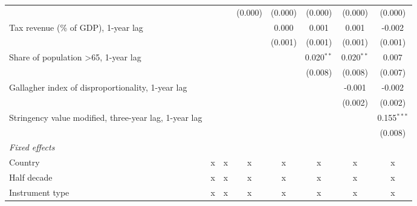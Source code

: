 \begin{tabular}{lccccccc}
                                                                 &                &                & (0.000)       & (0.000)       & (0.000)       & (0.000)       & (0.000)\\   
   Tax revenue (\% of GDP), 1-year lag                           &                &                &               & 0.000         & 0.001         & 0.001         & -0.002\\   
                                                                 &                &                &               & (0.001)       & (0.001)       & (0.001)       & (0.001)\\   
   Share of population >65, 1-year lag                           &                &                &               &               & 0.020$^{**}$  & 0.020$^{**}$  & 0.007\\   
                                                                 &                &                &               &               & (0.008)       & (0.008)       & (0.007)\\   
   Gallagher index of disproportionality, 1-year lag             &                &                &               &               &               & -0.001        & -0.002\\   
                                                                 &                &                &               &               &               & (0.002)       & (0.002)\\   
   Stringency value modified, three-year lag, 1-year lag         &                &                &               &               &               &               & 0.155$^{***}$\\   
                                                                 &                &                &               &               &               &               & (0.008)\\   
   \emph{Fixed effects}\\
   Country                                                       & x              & x              & x             & x             & x             & x             & x\\  
   Half decade                                                   & x              & x              & x             & x             & x             & x             & x\\  
   Instrument type                                               & x              & x              & x             & x             & x             & x             & x\\  

\end{tabular}
